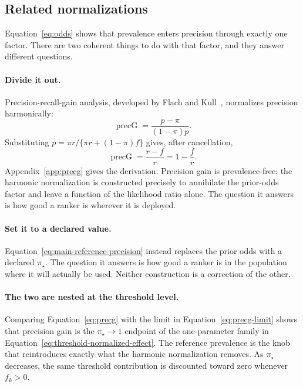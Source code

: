\documentclass[11pt]{article}
\theoremstyle{remark}
\begin{document}
\subsection{Related normalizations}
\label{sec:related-normalizations}

Equation~\eqref{eq:odds} shows that prevalence enters precision through exactly one factor. There are two coherent things to do with that factor, and they answer different questions.

\paragraph{Divide it out.}
Precision-recall-gain analysis, developed by Flach and Kull~\cite{flach2015prg}, normalizes precision harmonically:
\[
\operatorname{precG}
=
\frac{p-\pi}{(1-\pi)p}.
\]
Substituting $p=\pi r/\{\pi r+(1-\pi)f\}$ gives, after cancellation,
\begin{equation}
\operatorname{precG}
=
\frac{r-f}{r}
=
1-\frac{f}{r}.
\label{eq:precg}
\end{equation}
Appendix~\ref{app:precg} gives the derivation. Precision gain is prevalence-free: the harmonic normalization is constructed precisely to annihilate the prior-odds factor and leave a function of the likelihood ratio alone. The question it answers is how good a ranker is wherever it is deployed.

\paragraph{Set it to a declared value.}
Equation~\eqref{eq:main-reference-precision} instead replaces the prior odds with a declared $\pi_\star$. The question it answers is how good a ranker is in the population where it will actually be used. Neither construction is a correction of the other.

\paragraph{The two are nested at the threshold level.}
Comparing Equation~\eqref{eq:precg} with the limit in Equation~\eqref{eq:precg-limit} shows that precision gain is the $\pi_\star\to1$ endpoint of the one-parameter family in Equation~\eqref{eq:threshold-normalized-effect}. The reference prevalence is the knob that reintroduces exactly what the harmonic normalization removes. As $\pi_\star$ decreases, the same threshold contribution is discounted toward zero whenever $f_k>0$.
\end{document}
